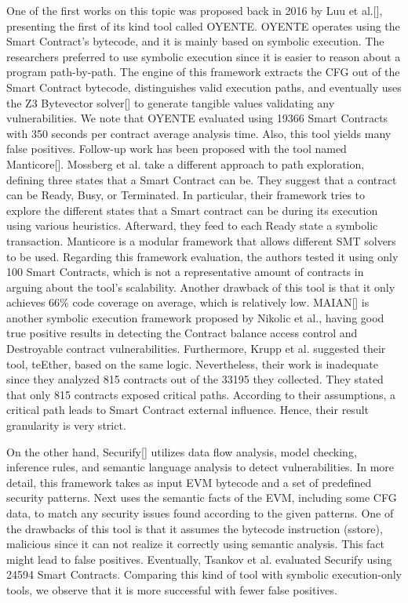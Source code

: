 \documentclass[a4paper,11pt]{article}
\begin{document}
One of the first works on this topic was proposed back in 2016 by Luu et al.[],
presenting the first of its kind tool called OYENTE. OYENTE operates using the
Smart Contract's bytecode, and it is mainly based on symbolic execution. The
researchers preferred to use symbolic execution since it is easier to reason
about a program path-by-path. The engine of this framework extracts the CFG out
of the Smart Contract bytecode, distinguishes valid execution paths, and
eventually uses the Z3 Bytevector solver[] to generate tangible values
validating any vulnerabilities. We note that OYENTE evaluated using 19366 Smart
Contracts with 350 seconds per contract average analysis time. Also, this tool
yields many false positives. Follow-up work has been proposed with the tool
named Manticore[]. Mossberg et al. take a different approach to path
exploration, defining three states that a Smart Contract can be. They suggest
that a contract can be Ready, Busy, or Terminated. In particular, their
framework tries to explore the different states that a Smart contract can be
during its execution using various heuristics. Afterward, they feed to each
Ready state a symbolic transaction. Manticore is a modular framework that allows
different SMT solvers to be used. Regarding this framework evaluation, the
authors tested it using only 100 Smart Contracts, which is not a representative
amount of contracts in arguing about the tool's scalability. Another drawback of
this tool is that it only achieves 66\% code coverage on average, which is
relatively low. MAIAN[] is another symbolic execution framework proposed by
Nikolic et al., having good true positive results in detecting the Contract
balance access control and Destroyable contract vulnerabilities. Furthermore,
Krupp et al. suggested their tool, teEther, based on the same logic.
Nevertheless, their work is inadequate since they analyzed 815 contracts out of
the 33195 they collected. They stated that only 815 contracts exposed critical
paths. According to their assumptions, a critical path leads to Smart Contract
external influence. Hence, their result granularity is very strict.

On the other hand, Securify[] utilizes data flow analysis, model checking,
inference rules, and semantic language analysis to detect vulnerabilities. In
more detail, this framework takes as input EVM bytecode and a set of predefined
security patterns. Next uses the semantic facts of the EVM, including some CFG
data, to match any security issues found according to the given patterns. One of
the drawbacks of this tool is that it assumes the bytecode instruction (sstore),
malicious since it can not realize it correctly using semantic analysis. This
fact might lead to false positives. Eventually, Tsankov et al. evaluated
Securify using 24594 Smart Contracts. Comparing this kind of tool with symbolic
execution-only tools, we observe that it is more successful with fewer false
positives.
\end{document}
